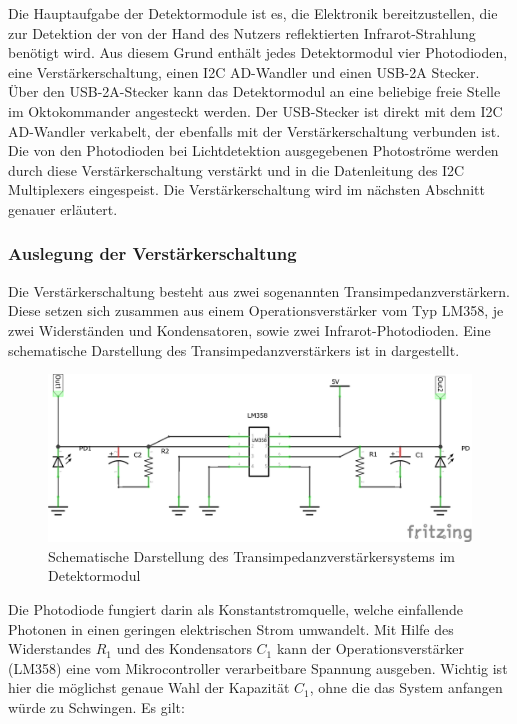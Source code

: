 Die Hauptaufgabe der Detektormodule ist es, die Elektronik bereitzustellen, die zur Detektion der von der Hand des Nutzers reflektierten Infrarot-Strahlung benötigt wird. Aus diesem Grund enthält jedes Detektormodul vier Photodioden, eine Verstärkerschaltung, einen I2C AD-Wandler und einen USB-2A Stecker. Über den USB-2A-Stecker kann das Detektormodul an eine beliebige freie Stelle im Oktokommander angesteckt werden. Der USB-Stecker ist direkt mit dem I2C AD-Wandler verkabelt, der ebenfalls mit der Verstärkerschaltung verbunden ist. Die von den Photodioden bei Lichtdetektion ausgegebenen Photoströme werden durch diese Verstärkerschaltung verstärkt und in die Datenleitung des I2C Multiplexers eingespeist. Die Verstärkerschaltung wird im nächsten Abschnitt genauer erläutert.


\subsubsection*{Auslegung der Verstärkerschaltung}
Die Verstärkerschaltung besteht aus zwei sogenannten Transimpedanzverstärkern. Diese setzen sich zusammen aus einem Operationsverstärker vom Typ LM358, je zwei Widerständen und Kondensatoren, sowie zwei Infrarot-Photodioden. Eine schematische Darstellung des Transimpedanzverstärkers ist in  dargestellt.
\begin{figure}[H]
	\centering
	\includegraphics[scale=0.75]{../figures/Transimpedanz.png}
	\caption{Schematische Darstellung des Transimpedanzverstärkersystems im Detektormodul}
	\label{fig:Transimpedanz}
\end{figure}
\noindent
Die Photodiode fungiert darin als Konstantstromquelle, welche einfallende Photonen in einen geringen elektrischen Strom umwandelt. Mit Hilfe des Widerstandes $R_1$ und des Kondensators $C_1$ kann der Operationsverstärker (LM358) eine vom Mikrocontroller verarbeitbare Spannung ausgeben. Wichtig ist hier die möglichst genaue Wahl der Kapazität $C_1$, ohne die das System anfangen würde zu Schwingen. Es gilt:
